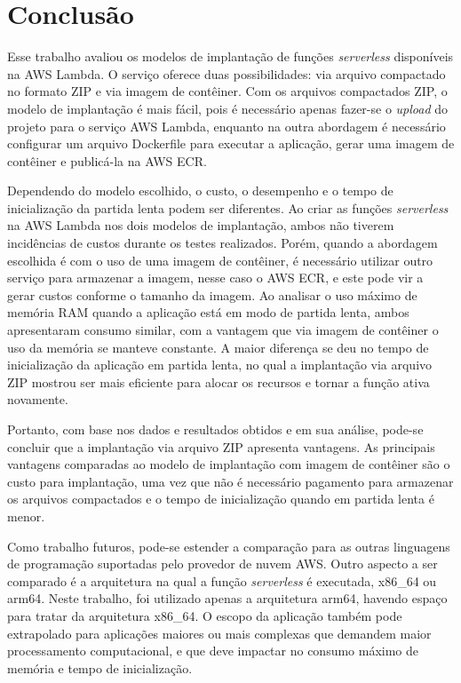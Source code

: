 \documentclass[conference]{IEEEtran}
\begin{document}
\section{Conclusão}
\label{sec:Conclusion}

Esse trabalho avaliou os modelos de implantação de funções \textit{serverless} disponíveis na AWS Lambda. O serviço oferece duas possibilidades: via arquivo compactado no formato ZIP e via imagem de contêiner. Com os arquivos compactados ZIP, o modelo de implantação é mais fácil, pois é necessário apenas fazer-se o \textit{upload} do projeto para o serviço AWS Lambda, enquanto na outra abordagem é necessário configurar um arquivo Dockerfile para executar a aplicação, gerar uma imagem de contêiner e publicá-la na AWS ECR.

Dependendo do modelo escolhido, o custo, o desempenho e o tempo de inicialização da partida lenta podem ser diferentes.
Ao criar as funções \textit{serverless} na AWS Lambda nos dois modelos de implantação, ambos não tiverem incidências de custos durante os testes realizados. Porém, quando a abordagem escolhida é com o uso de uma imagem de contêiner, é necessário utilizar outro serviço para armazenar a imagem, nesse caso o AWS ECR, e este pode vir a gerar custos conforme o tamanho da imagem. Ao analisar o uso máximo de memória RAM quando a aplicação está em modo de partida lenta, ambos apresentaram consumo similar, com a vantagem que via imagem de contêiner o uso da memória se manteve constante. A maior diferença se deu no tempo de inicialização da aplicação em partida lenta, no qual a implantação via arquivo ZIP mostrou ser mais eficiente para alocar os recursos e tornar a função ativa novamente.

Portanto, com base nos dados e resultados obtidos e em sua análise, pode-se concluir que a implantação via arquivo ZIP apresenta vantagens. As principais vantagens comparadas ao modelo de implantação com imagem de contêiner são o custo para implantação, uma vez que não é necessário pagamento para armazenar os arquivos compactados e o tempo de inicialização quando em partida lenta é menor.  

Como trabalho futuros, pode-se estender a comparação para as outras linguagens de programação suportadas pelo provedor de nuvem AWS. Outro aspecto a ser comparado é a arquitetura na qual a função \textit{serverless} é executada, x86\_64 ou arm64. Neste trabalho, foi utilizado apenas a arquitetura arm64, havendo espaço para tratar da arquitetura x86\_64. O escopo da aplicação também pode extrapolado para aplicações maiores ou mais complexas que demandem maior processamento computacional, e que deve impactar no consumo máximo de memória e tempo de inicialização.




\end{document}
